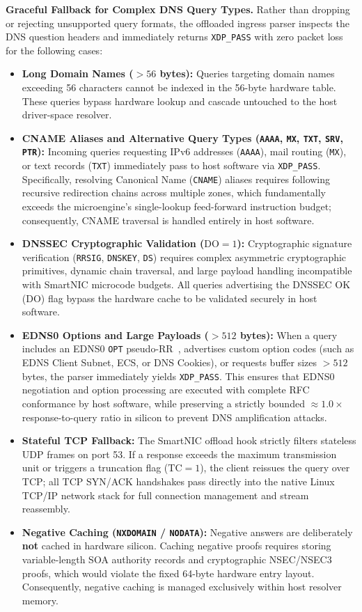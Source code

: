 \documentclass[a4paper,fleqn,colorlinks,hidelinks]{cas-sc}
\begin{document}
\textbf{Graceful Fallback for Complex DNS Query Types.} Rather than dropping or rejecting unsupported query formats, the offloaded ingress parser inspects the DNS question headers and immediately returns \texttt{XDP\_PASS} with zero packet loss for the following cases:
\begin{itemize}
    \item \textbf{Long Domain Names ($>56$ bytes):} Queries targeting domain names exceeding 56 characters cannot be indexed in the 56-byte hardware table. These queries bypass hardware lookup and cascade untouched to the host driver-space resolver.
    \item \textbf{CNAME Aliases and Alternative Query Types (\texttt{AAAA}, \texttt{MX}, \texttt{TXT}, \texttt{SRV}, \texttt{PTR}):} Incoming queries requesting IPv6 addresses (\texttt{AAAA}), mail routing (\texttt{MX}), or text records (\texttt{TXT}) immediately pass to host software via \texttt{XDP\_PASS}. Specifically, resolving Canonical Name (\texttt{CNAME}) aliases requires following recursive redirection chains across multiple zones, which fundamentally exceeds the microengine's single-lookup feed-forward instruction budget; consequently, CNAME traversal is handled entirely in host software.
    \item \textbf{DNSSEC Cryptographic Validation ($\text{DO}=1$):} Cryptographic signature verification (\texttt{RRSIG}, \texttt{DNSKEY}, \texttt{DS}) requires complex asymmetric cryptographic primitives, dynamic chain traversal, and large payload handling incompatible with SmartNIC microcode budgets. All queries advertising the DNSSEC OK ($\text{DO}$) flag bypass the hardware cache to be validated securely in host software.
    \item \textbf{EDNS0 Options and Large Payloads ($>512$ bytes):} When a query includes an EDNS0 \texttt{OPT} pseudo-RR~\citep[RFC~6891]{rfc6891}, advertises custom option codes (such as EDNS Client Subnet, ECS, or DNS Cookies), or requests buffer sizes $>512$ bytes, the parser immediately yields \texttt{XDP\_PASS}. This ensures that EDNS0 negotiation and option processing are executed with complete RFC conformance by host software, while preserving a strictly bounded $\approx 1.0\times$ response-to-query ratio in silicon to prevent DNS amplification attacks.
    \item \textbf{Stateful TCP Fallback:} The SmartNIC offload hook strictly filters stateless UDP frames on port 53. If a response exceeds the maximum transmission unit or triggers a truncation flag ($\text{TC}=1$), the client reissues the query over TCP; all TCP SYN/ACK handshakes pass directly into the native Linux TCP/IP network stack for full connection management and stream reassembly.
    \item \textbf{Negative Caching (\texttt{NXDOMAIN} / \texttt{NODATA}):} Negative answers are deliberately \textbf{not} cached in hardware silicon. Caching negative proofs requires storing variable-length SOA authority records and cryptographic NSEC/NSEC3 proofs, which would violate the fixed 64-byte hardware entry layout. Consequently, negative caching is managed exclusively within host resolver memory.
\end{itemize}
\end{document}
